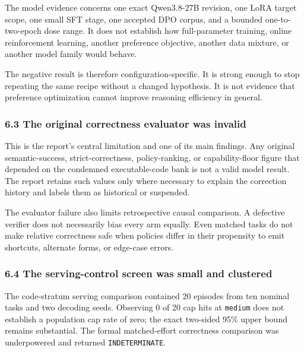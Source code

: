 \documentclass[
  9pt,
  letterpaper,
]{article}
\begin{document}
The model evidence concerns one exact Qwen3.8-27B revision, one LoRA
target scope, one small SFT stage, one accepted DPO corpus, and a
bounded one-to-two-epoch dose range. It does not establish how
full-parameter training, online reinforcement learning, another
preference objective, another data mixture, or another model family
would behave.

The negative result is therefore configuration-specific. It is strong
enough to stop repeating the same recipe without a changed hypothesis.
It is not evidence that preference optimization cannot improve reasoning
efficiency in general.

\hypertarget{63-the-original-correctness-evaluator-was-invalid}{%
\subsubsection{6.3 The original correctness evaluator was
invalid}\label{63-the-original-correctness-evaluator-was-invalid}}

This is the report's central limitation and one of its main findings.
Any original semantic-success, strict-correctness, policy-ranking, or
capability-floor figure that depended on the condemned executable-code
bank is not a valid model result. The report retains such values only
where necessary to explain the correction history and labels them as
historical or suspended.

The evaluator failure also limits retrospective causal comparison. A
defective verifier does not necessarily bias every arm equally. Even
matched tasks do not make relative correctness safe when policies differ
in their propensity to emit shortcuts, alternate forms, or edge-case
errors.

\hypertarget{64-the-serving-control-screen-was-small-and-clustered}{%
\subsubsection{6.4 The serving-control screen was small and
clustered}\label{64-the-serving-control-screen-was-small-and-clustered}}

The code-stratum serving comparison contained 20 episodes from ten
nominal tasks and two decoding seeds. Observing 0 of 20 cap hits at
\texttt{medium} does not establish a population cap rate of zero; the
exact two-sided 95\% upper bound remains substantial. The formal
matched-effort correctness comparison was underpowered and returned
\texttt{INDETERMINATE}.
\end{document}
